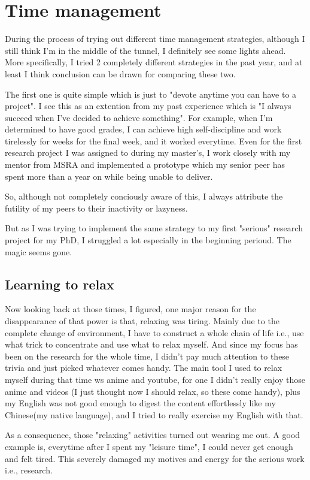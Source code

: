 \section{Time management}
\label{sec:time}
During the process of trying out different time management strategies, although I still think I'm in the middle of the tunnel, I definitely see some lights ahead.
More specifically, I tried 2 completely different strategies in the past year, and at least I think conclusion can be drawn for comparing these two.

The first one is quite simple which is just to "devote anytime you can have to a project".
I see this as an extention from my past experience which is "I always succeed when I've decided to achieve something".
For example, when I'm determined to have good grades, I can achieve high self-discipline and work tirelessly for weeks for the final week, and it worked everytime.
Even for the first research project I was assigned to during my master's, I work closely with my mentor from MSRA and implemented a prototype 
which my senior peer has spent more than a year on while being unable to deliver.

So, although not completely conciously aware of this, I always attribute the futility of my peers to their inactivity or lazyness.

But as I was trying to implement the same strategy to my first "serious" research project for my PhD, I struggled a lot especially in the beginning perioud.
The magic seems gone.
\subsection{Learning to relax}
Now looking back at those times, I figured, one major reason for the disappearance of that power is that, relaxing was tiring.
Mainly due to the complete change of environment, I have to construct a whole chain of life i.e., use what trick to concentrate and use what to relax myself.
And since my focus has been on the research for the whole time, I didn't pay much attention to these trivia and just picked whatever comes handy.
The main tool I used to relax myself during that time ws anime and youtube, for one I didn't really enjoy those anime and videos
(I just thought now I should relax, so these come handy), plus my English was not good enough to digest the content effortlessly 
like my Chinese(my native language), and I tried to really exercise my English with that.

As a consequence, those "relaxing" activities turned out wearing me out. A good example is, everytime after I spent my "leisure time", I could never get enough and felt tired.
This severely damaged my motives and energy for the serious work i.e., research.

